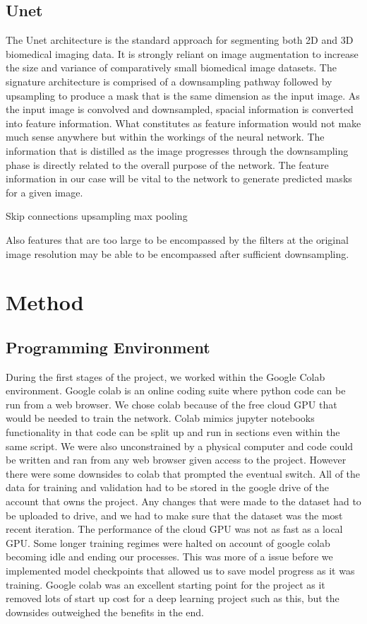 \documentclass[12pt]{article}
\begin{document}
\subsection{Unet}
The Unet architecture is the standard approach for segmenting both 2D and 3D biomedical imaging data.
It is strongly reliant on image augmentation to increase the size and variance of comparatively small biomedical image datasets.
The signature architecture is comprised of a downsampling pathway followed by upsampling to produce a mask that is the same dimension as the input image.
As the input image is convolved and downsampled, spacial information is converted into feature information.
What constitutes as feature information would not make much sense anywhere but within the workings of the neural network.
The information that is distilled as the image progresses through the downsampling phase is directly related to the overall purpose of the network. The feature information in our case will be vital to the network to generate predicted masks for a given image.

Skip connections
upsampling
max pooling

Also features that are too large to be encompassed by the filters at the original image resolution may be able to be encompassed after sufficient downsampling.

\section{Method}
\subsection{Programming Environment}
During the first stages of the project, we worked within the Google Colab environment.
Google colab is an online coding suite where python code can be run from a web browser.
We chose colab because of the free cloud GPU that would be needed to train the network.
Colab mimics jupyter notebooks functionality in that code can be split up and run in sections even within the same script.
We were also unconstrained by a physical computer and code could be written and ran from any web browser given access to the project.
However there were some downsides to colab that prompted the eventual switch.
All of the data for training and validation had to be stored in the google drive of the account that owns the project.
Any changes that were made to the dataset had to be uploaded to drive, and we had to make sure that the dataset was the most recent iteration.
The performance of the cloud GPU was not as fast as a local GPU.
Some longer training regimes were halted on account of google colab becoming idle and ending our processes.
This was more of a issue before we implemented model checkpoints that allowed us to save model progress as it was training.
Google colab was an excellent starting point for the project as it removed lots of start up cost for a deep learning project such as this, but the downsides outweighed the benefits in the end.
\end{document}
